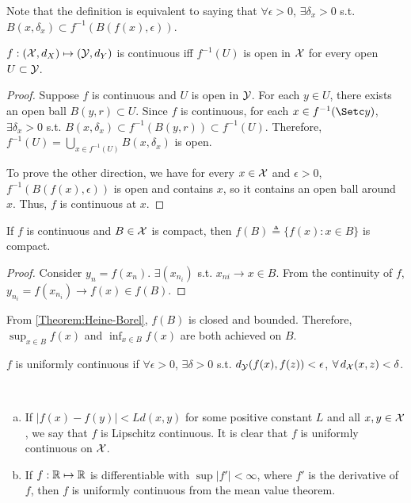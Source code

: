 \documentclass[12pt]{article}
\begin{document}
Note that the definition is equivalent to saying that $\forall \epsilon>0$, $\exists \delta_x>0$ s.t. $B(x,\delta_x) \subset f^{-1}(B(f(x),\epsilon))$. 

\begin{Lemma}
$f: (\mathcal{X}, d_X) \mapsto (\mathcal{Y}, d_Y)$ is continuous iff $f^{-1}(U)$ is open in $\mathcal{X}$ for every open $U \subset \mathcal{Y}$.
\end{Lemma}
\begin{proof}
Suppose $f$ is continuous and $U$ is open in $\mathcal{Y}$. For each $y\in U$, there exists an open ball $B(y,r) \subset U$. Since $f$ is continuous, for each $x \in f^{-1}(\set{y})$, $\exists \delta_x>0$ s.t. $B(x,\delta_x) \subset f^{-1}(B(y,r)) \subset f^{-1}(U)$. Therefore, $f^{-1}(U) = \bigcup_{x\in f^{-1}(U)} B(x,\delta_x)$ is open. 

To prove the other direction, we have for every $x\in\mathcal{X}$ and $\epsilon>0$, $f^{-1}(B(f(x),\epsilon))$ is open and contains $x$, so it contains an open ball around $x$. Thus, $f$ is continuous at $x$. 
\end{proof}

\begin{Lemma}
If $f$ is continuous and $B\in \mathcal{X}$ is compact, then $f(B)\triangleq\{f(x): x \in B\}$ is compact.
\end{Lemma}
\begin{proof}
Consider $y_n= f(x_n)$. $\exists (x_{n_i})$ s.t. $x_{ni}\to x \in B$. From the continuity of $f$, $y_{n_i}=f(x_{n_i}) \to f(x) \in f(B)$. 
\end{proof}

From \cref{Theorem:Heine-Borel}, $f(B)$ is closed and bounded. Therefore, $\sup_{x\in B} f(x)$ and $\inf_{x\in B} f(x)$ are both achieved on $B$.

\begin{Definition}
$f$ is uniformly continuous if $\forall \epsilon>0$, $\exists \delta>0$ s.t. $d_{\mathcal{Y}}(f(x),f(z))<\epsilon$, $\forall d_{\calX}(x,z)<\delta$.
\end{Definition}

\begin{Example}\
\begin{enumerate}[(a)]
	\item If $|f(x)-f(y)| < L d(x,y)$ for some positive constant $L$ and all $x,y \in \mathcal{X}$, we say that $f$ is Lipschitz continuous. It is clear that $f$ is uniformly continuous on $\mathcal{X}$. 
	\item If $f : \mathbb{R}\mapsto\mathbb{R}$ is differentiable with $\sup |f'| <\infty$, where $f'$ is the derivative of $f$, then $f$ is uniformly continuous from the mean value theorem.
\end{enumerate}
\end{Example}
\end{document}
